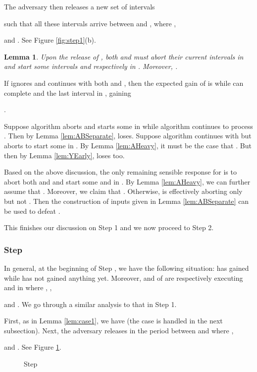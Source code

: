 \documentclass[11pt]{article}
\newtheorem{lemma}{Lemma}[section]
\newcommand{\qed}{\hspace*{\fill}\par\medskip}
\newenvironment{proof}{\noindent{\it Proof. }\ignorespaces}{\qed}
\begin{document}
The adversary then releases a new set of intervals 

such that all these intervals arrive between
 and ,
where ,

and .
See Figure \ref{fig:step1}(b).

\begin{lemma} \label{lem:mustmoveon}
Upon the release of , 
both  and  must abort their current intervals in 
and start some intervals  and  respectively in .
Moreover, .
\end{lemma}
\begin{proof}
If  ignores  and continues with both  and ,
then the expected gain of  is 
while  can complete  and the last interval in ,
gaining   

.

Suppose algorithm  aborts  and starts some  in
 while algorithm  continues to process .
Then by Lemma \ref{lem:ABSeparate},  loses.
Suppose algorithm  continues with  but 
 aborts  to start some  in .
By Lemma \ref{lem:AHeavy}, it must be the case that
.
But then by Lemma \ref{lem:YEarly},  loses too.

Based on the above discussion, 
the only remaining sensible response for 
is to abort both  and 
and start some  and  in .
By Lemma \ref{lem:AHeavy},
we can further assume that .
Moreover, we claim that .
Otherwise,  is effectively aborting only  but not .
Then the construction of inputs given in Lemma \ref{lem:ABSeparate}
can be used to defeat .
\end{proof}

This finishes our discussion on Step 1 and we now proceed to Step 2.

\subsubsection{Step }

In general, at the beginning of Step ,
we have the following situation:
 has gained 
while  has not gained anything yet.
Moreover,  and  of  
are respectively executing  and 
in  
where , 
,

and .
We go through a similar analysis to that in Step 1.

First, as in Lemma \ref{lem:case1}, we have 
(the case  is handled in the next subsection). 
Next, the adversary releases  
in the period between  and 
where ,

and .
See Figure \ref{fig:stepi}.

\begin{figure}
\centerline{ \epsfysize=1.3in  }
\caption{Step }
\label{fig:stepi}
\end{figure}
\end{document}
